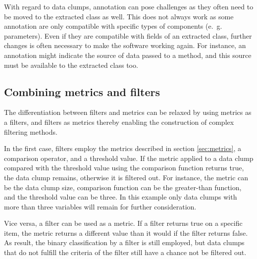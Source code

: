 With regard to data clumps, annotation can pose challenges as they often need to be moved to the extracted class as well. This does not always work as some annotation are only compatible with specific types of components (e.~g. parameters). Even if they are compatible with fields of an extracted class, further changes is often necessary to make the software working again. For instance, an annotation might indicate the source of data passed to a method, and this source must be available to the extracted class too. 

\subsection{Combining metrics and filters}

The differentiation between filters and metrics can be relaxed by using metrics as a filters, and filters as metrics thereby enabling the construction of complex filtering methods. 

In the first case, filters employ the metrics described in section \ref{sec:metrics}, a comparison operator, and a threshold value. If the metric applied to a data clump compared with the threshold value using the comparison function returns true, the data clump remains, otherwise it is filtered out. For instance, the metric can be the data clump size, comparison function can be the greater-than function, and the threshold value can be three. In this example only data clumps with more than three variables will remain for further consideration. 

Vice versa, a filter can be used as a metric. If a filter returns true on a specific item, the metric returns a different value than it would if the filter returns false. As result, the binary classification by a filter is still employed, but data clumps that do not fulfill the criteria of the filter still have a chance not be filtered out. 

